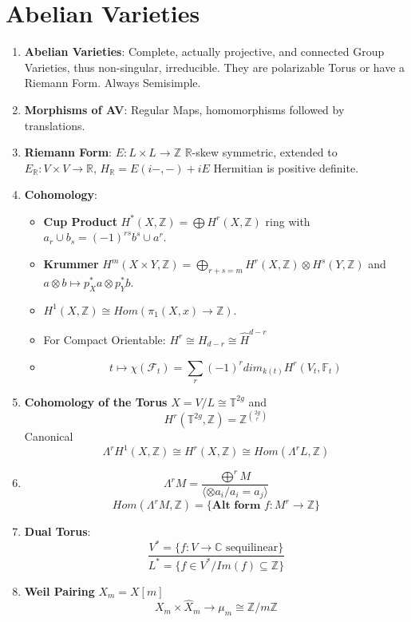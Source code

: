 \documentclass{article}
\newcommand{\R}{\mathbb{R}}
\newcommand{\C}{\mathbb{C}}
\newcommand{\Z}{\mathbb{Z}}
\newcommand{\T}{\mathbb{T}}
\newcommand{\ra}{\rightarrow}
\begin{document}
\section{Abelian Varieties}
\begin{multicols}{2}
\begin{enumerate}
\item \textbf{Abelian Varieties}: Complete, actually projective, and connected Group Varieties, thus non-singular, irreducible. They are polarizable Torus or have a Riemann Form. Always Semisimple. 

\item \textbf{Morphisms of AV}: Regular Maps, homomorphisms followed by translations. 

\item \textbf{Riemann Form}: $E: L \times L \ra \Z$  $\R$-skew symmetric, extended to $E_\R: V \times V \ra \R$, $H_\R = E(i-,-) + iE$ Hermitian is positive definite. 

\item \textbf{Cohomology}:
\begin{itemize}
\item \textbf{Cup Product} $H^*(X,\Z) = \bigoplus H^r(X,\Z)$ ring with $a_r \cup b_s = (-1)^{rs} b^s \cup a^r$.
\item \textbf{Krummer} $H^m(X \times Y,\Z) = \bigoplus_{r+s = m}H^r(X,\Z) \otimes H^s(Y,\Z)$ and $a \otimes b \mapsto p_X^*a \otimes p_Y^*b$.
\item $H^1(X,\Z) \cong Hom(\pi_1(X,x) \ra \Z)$.
\item For Compact Orientable: $H^r \cong H_{d-r} \cong \hat{H}^{d-r}$
\item \[t \mapsto \chi(\mathcal{F}_t) = \sum_r (-1)^r dim_{k(t)} H^r(V_t,\mathbb{F}_t) \]
\end{itemize}

\item \textbf{Cohomology of the Torus} $X = V/L \cong \mathbb{T}^{2g}$ and 
\[H^r(\T^{2g},\Z) = \Z^{\binom{2g}{r}}\]
Canonical 
\[\Lambda^rH^1(X,\Z) \cong H^r(X,\Z) \cong Hom(\Lambda^r L, \Z)\]


\item 
\[\Lambda^r M = \frac{\bigoplus^r M}{\langle \otimes a_i/ a_i = a_j \rangle}\]
\[Hom(\Lambda^rM,\Z) = \{\textbf{Alt form } f: M^r \ra \Z\}\]

 
\item \textbf{Dual Torus}: 
\[\frac{V^* = \{f: V \ra \C \textrm{ sequilinear}\}} {L^* = \{f \in V^*/Im(f) \subseteq \Z\}}\]


\item \textbf{Weil Pairing} $X_m = X[m]$
\[X_m \times \hat{X}_m \ra \mu_m \cong \Z/m\Z\] 


\end{enumerate}
\end{multicols}
\end{document}
